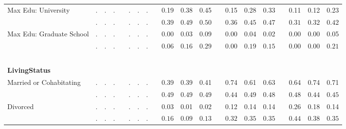 \begin{center}
{\begin{longtable}{L{5cm} c c c p{.5cm} c c c p{.5cm} c c c p{.5cm} c c c p{.5cm} c c c}
 \quad Max Edu: University & . &         . &         . & &         . &         . &         . & &      0.19 &      0.38 &      0.45 & &      0.15 &      0.28 &      0.33 & &      0.11 &      0.12 &      0.23 \\*
 \quad & $\mathit{        .}$ & $\mathit{        .}$ & $\mathit{        .}$ & & $\mathit{        .}$ & $\mathit{        .}$ & $\mathit{        .}$ & & $\mathit{     0.39}$ & $\mathit{     0.49}$ & $\mathit{     0.50}$ & & $\mathit{     0.36}$ & $\mathit{     0.45}$ & $\mathit{     0.47}$ & & $\mathit{     0.31}$ & $\mathit{     0.32}$ & $\mathit{     0.42}$ \\[.2em]
 \quad Max Edu: Graduate School & . &         . &         . & &         . &         . &         . & &      0.00 &      0.03 &      0.09 & &      0.00 &      0.04 &      0.02 & &      0.00 &      0.00 &      0.05 \\*
 \quad & $\mathit{        .}$ & $\mathit{        .}$ & $\mathit{        .}$ & & $\mathit{        .}$ & $\mathit{        .}$ & $\mathit{        .}$ & & $\mathit{     0.06}$ & $\mathit{     0.16}$ & $\mathit{     0.29}$ & & $\mathit{     0.00}$ & $\mathit{     0.19}$ & $\mathit{     0.15}$ & & $\mathit{     0.00}$ & $\mathit{     0.00}$ & $\mathit{     0.21}$ \\[.2em]
 ~\\[-.5em]
\textbf{LivingStatus} \\[.6em]
 \quad Married or Cohabitating & . &         . &         . & &         . &         . &         . & &      0.39 &      0.39 &      0.41 & &      0.74 &      0.61 &      0.63 & &      0.64 &      0.74 &      0.71 \\*
 \quad & $\mathit{        .}$ & $\mathit{        .}$ & $\mathit{        .}$ & & $\mathit{        .}$ & $\mathit{        .}$ & $\mathit{        .}$ & & $\mathit{     0.49}$ & $\mathit{     0.49}$ & $\mathit{     0.49}$ & & $\mathit{     0.44}$ & $\mathit{     0.49}$ & $\mathit{     0.48}$ & & $\mathit{     0.48}$ & $\mathit{     0.44}$ & $\mathit{     0.45}$ \\[.2em]
 \quad Divorced & . &         . &         . & &         . &         . &         . & &      0.03 &      0.01 &      0.02 & &      0.12 &      0.14 &      0.14 & &      0.26 &      0.18 &      0.14 \\*
 \quad & $\mathit{        .}$ & $\mathit{        .}$ & $\mathit{        .}$ & & $\mathit{        .}$ & $\mathit{        .}$ & $\mathit{        .}$ & & $\mathit{     0.16}$ & $\mathit{     0.09}$ & $\mathit{     0.13}$ & & $\mathit{     0.32}$ & $\mathit{     0.35}$ & $\mathit{     0.35}$ & & $\mathit{     0.44}$ & $\mathit{     0.38}$ & $\mathit{     0.35}$ \\[.2em]

\end{longtable}}
\end{center}
